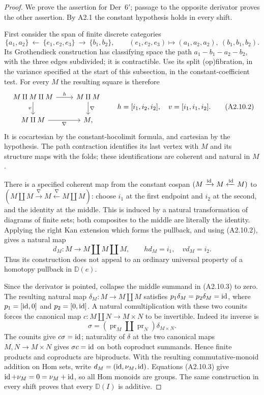 \begin{proof}
We prove the assertion for Der~$6'$; passage to the opposite derivator proves
the other assertion. By A2.1 the constant hypothesis holds in every shift.

First consider the span of finite discrete categories
\[
 \{a_1,a_2\}\ \longleftarrow\
 \{e_1,e_2,e_3\}\ \longrightarrow\ \{b_1,b_2\},
 \qquad
 (e_1,e_2,e_3)\longmapsto(a_1,a_2,a_2),\ (b_1,b_1,b_2).
 \tag{A2.10.1}
\]
Its Grothendieck construction has classifying space the path
$a_1-b_1-a_2-b_2$, with the three edges subdivided; it is contractible.
Use its split (op)fibration, in the variance specified at the start of this
subsection, in the constant-coefficient test. For every $M$ the resulting
square is therefore
\[
 \begin{tikzcd}
 M\amalg M\amalg M
   \ar[r,"h"]\ar[d,"v"']&
 M\amalg M\ar[d,"\nabla"]\\
 M\amalg M\ar[r,"\nabla"']&M ,
 \end{tikzcd}
 \qquad
 h=[i_1,i_2,i_2],\quad v=[i_1,i_1,i_2].
 \tag{A2.10.2}
\]
It is cocartesian by the constant-hocolimit formula, and cartesian by the
hypothesis. The path contraction identifies its last vertex with $M$ and
its structure maps with the folds; these identifications are coherent and
natural in $M$.

There is a specified coherent map from the constant cospan
$(M\xrightarrow{\operatorname{id}}M\xleftarrow{\operatorname{id}}M)$ to
$(M\amalg M\xrightarrow{\nabla}M\xleftarrow{\nabla}M\amalg M)$:
choose $i_1$ at the first endpoint and $i_2$ at the second, and the identity
at the middle. This is induced by a natural transformation of diagrams of
finite sets; both composites to the middle are literally the identity.
Applying the right Kan extension which forms the pullback, and using
(A2.10.2), gives a natural map
\[
 d_M:M\longrightarrow M\amalg M\amalg M,\qquad
 h d_M=i_1,\quad v d_M=i_2.
 \tag{A2.10.3}
\]
Thus its construction does not appeal to an ordinary universal property of
a homotopy pullback in $\mathbb D(e)$.

Since the derivator is pointed, collapse the middle summand in (A2.10.3)
to zero. The resulting natural map
$\delta_M:M\to M\amalg M$ satisfies
$p_1\delta_M=p_2\delta_M=\operatorname{id}$, where $p_1=[\operatorname{id},0]$ and
$p_2=[0,\operatorname{id}]$. A natural comultiplication with these two counits forces
the canonical map $c:M\amalg N\to M\times N$ to be invertible.
Indeed its inverse is
\[
 \sigma=(\operatorname{pr}_M\amalg\operatorname{pr}_N)
                   \delta_{M\times N}.
 \tag{A2.10.4}
\]
The counits give $c\sigma=\operatorname{id}$; naturality of $\delta$ at the two canonical
maps $M,N\to M\times N$ gives $\sigma c=\operatorname{id}$ on both coproduct summands.
Hence finite products and coproducts are biproducts. With the resulting
commutative-monoid addition on Hom sets, write
$d_M=(\operatorname{id},\nu_M,\operatorname{id})$. Equations (A2.10.3) give
$\operatorname{id}+\nu_M=0=\nu_M+\operatorname{id}$, so all Hom monoids are groups.
The same construction in every shift proves that every $\mathbb D(I)$ is
additive.


\end{proof}
